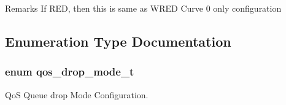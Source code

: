 \begin{DoxyRemark}{Remarks}
If R\-E\-D, then this is same as W\-R\-E\-D Curve 0 only configuration 
\end{DoxyRemark}


\subsection{Enumeration Type Documentation}
\hypertarget{group__FAPI__QOS__QUEUE_gac3dd371b02e4e2ff5023eaa49dfd7aab}{
\subsubsection[{qos\-\_\-drop\-\_\-mode\-\_\-t}]{\setlength{\rightskip}{0pt plus 5cm}enum {\bf qos\-\_\-drop\-\_\-mode\-\_\-t}}}\label{group__FAPI__QOS__QUEUE_gac3dd371b02e4e2ff5023eaa49dfd7aab}


Qo\-S Queue drop Mode Configuration. 

